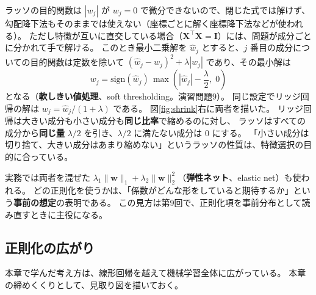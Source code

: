 ラッソの目的関数は $|w_j|$ が $w_j = 0$ で微分できないので、閉じた式では解けず、
勾配降下法もそのままでは使えない（座標ごとに解く座標降下法などが使われる）。
ただし特徴が互いに直交している場合（$\bm{X}^\top\bm{X} = \bm{I}$）には、問題が成分ごとに分かれて手で解ける。
このとき最小二乗解を $\hat{w}_j$ とすると、$j$ 番目の成分についての目的関数は定数を除いて
$(\hat{w}_j - w_j)^2 + \lambda|w_j|$ であり、その最小解は
\begin{equation}
  w_j = \mathrm{sign}(\hat{w}_j)\,\max\!\left( |\hat{w}_j| - \frac{\lambda}{2},\; 0 \right)
  \label{eq:soft-threshold}
\end{equation}
となる（\textbf{軟しきい値処理}、soft thresholding。演習問題9）。
同じ設定でリッジ回帰の解は $w_j = \hat{w}_j/(1 + \lambda)$ である。
図\ref{fig:shrink}右に両者を描いた。
リッジ回帰は大きい成分も小さい成分も\textbf{同じ比率}で縮めるのに対し、
ラッソはすべての成分から\textbf{同じ量} $\lambda/2$ を引き、$\lambda/2$ に満たない成分は $0$ にする。
「小さい成分は切り捨て、大きい成分はあまり縮めない」というラッソの性質は、特徴選択の目的に合っている。

実務では両者を混ぜた $\lambda_1\|\bm{w}\|_1 + \lambda_2\|\bm{w}\|_2^2$（\textbf{弾性ネット}、elastic net）も使われる。
どの正則化を使うかは、「係数がどんな形をしていると期待するか」という\textbf{事前の想定}の表明である。
この見方は第9回で、正則化項を事前分布として読み直すときに主役になる。


\subsection{正則化の広がり}

本章で学んだ考え方は、線形回帰を越えて機械学習全体に広がっている。
本章の締めくくりとして、見取り図を描いておく。

